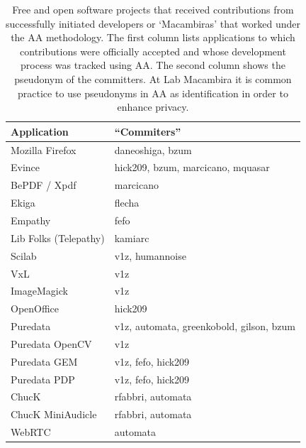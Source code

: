 \documentclass{article}
\begin{document}
\begin{table}
  \caption{Free and open software projects that received contributions from
  successfully initiated developers  or `Macambiras' that worked under the AA
  methodology. The first column lists applications to which contributions were
  officially accepted and whose development process was tracked using AA. The
  second column shows the pseudonym of the committers. At Lab Macambira it is
  common practice to use pseudonyms in AA as identification in order to enhance
  privacy.}
  \begin{center}
  \small\begin{tabular}{|l|l|}
        \hline
        Application           & ``Commiters''                       \\
        \hline \hline
        Mozilla Firefox       & daneoshiga, bzum                    \\
        Evince                & hick209, bzum, marcicano, mquasar   \\
        BePDF / Xpdf          & marcicano                           \\
        Ekiga                 & flecha                              \\
        Empathy               & fefo                                \\
        Lib Folks (Telepathy) & kamiarc                             \\
        Scilab                & v1z, humannoise                     \\
        VxL                   & v1z                                 \\
        ImageMagick           & v1z                                 \\
        OpenOffice            & hick209                             \\
        Puredata              & v1z, automata, greenkobold, gilson, bzum \\
        Puredata OpenCV       & v1z                                 \\
        Puredata GEM          & v1z, fefo, hick209                  \\
        Puredata PDP          & v1z, fefo, hick209                  \\
        ChucK                 & rfabbri, automata                   \\
        ChucK MiniAudicle     & rfabbri, automata                   \\
        WebRTC                & automata                            \\

\end{tabular}
\end{center}
\end{table}
\end{document}
